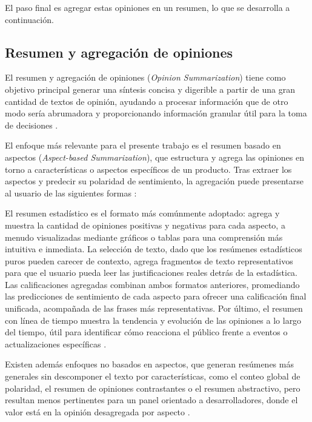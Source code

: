 El paso final es agregar estas opiniones en un resumen, lo que se desarrolla a continuación.

\subsection{Resumen y agregación de opiniones}\label{subsec:resumen_opiniones}

El resumen y agregación de opiniones (\emph{Opinion Summarization}) tiene como objetivo principal generar una síntesis concisa y digerible a partir de una gran cantidad de textos de opinión, ayudando a procesar información que de otro modo sería abrumadora y proporcionando información granular útil para la toma de decisiones \parencite{KimEtAl2010, ZhangEtAl2022}.

El enfoque más relevante para el presente trabajo es el resumen basado en aspectos (\emph{Aspect-based Summarization}), que estructura y agrega las opiniones en torno a características o aspectos específicos de un producto. Tras extraer los aspectos y predecir su polaridad de sentimiento, la agregación puede presentarse al usuario de las siguientes formas \parencite{KimEtAl2010}:

El resumen estadístico es el formato más comúnmente adoptado: agrega y muestra la cantidad de opiniones positivas y negativas para cada aspecto, a menudo visualizadas mediante gráficos o tablas para una comprensión más intuitiva e inmediata. La selección de texto, dado que los resúmenes estadísticos puros pueden carecer de contexto, agrega fragmentos de texto representativos para que el usuario pueda leer las justificaciones reales detrás de la estadística. Las calificaciones agregadas combinan ambos formatos anteriores, promediando las predicciones de sentimiento de cada aspecto para ofrecer una calificación final unificada, acompañada de las frases más representativas. Por último, el resumen con línea de tiempo muestra la tendencia y evolución de las opiniones a lo largo del tiempo, útil para identificar cómo reacciona el público frente a eventos o actualizaciones específicas \parencite{KimEtAl2010}.

Existen además enfoques no basados en aspectos, que generan resúmenes más generales sin descomponer el texto por características, como el conteo global de polaridad, el resumen de opiniones contrastantes o el resumen abstractivo, pero resultan menos pertinentes para un panel orientado a desarrolladores, donde el valor está en la opinión desagregada por aspecto \parencite{KimEtAl2010}.

